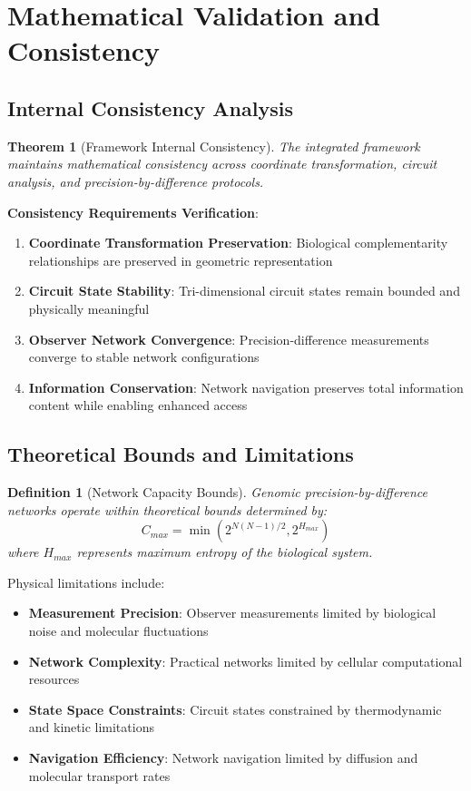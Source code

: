\documentclass[12pt,a4paper]{article}
\newtheorem{theorem}{Theorem}
\newtheorem{definition}{Definition}
\begin{document}
\section{Mathematical Validation and Consistency}

\subsection{Internal Consistency Analysis}

\begin{theorem}[Framework Internal Consistency]
The integrated framework maintains mathematical consistency across coordinate transformation, circuit analysis, and precision-by-difference protocols.
\end{theorem}

\textbf{Consistency Requirements Verification}:

\begin{enumerate}
\item \textbf{Coordinate Transformation Preservation}: Biological complementarity relationships are preserved in geometric representation
\item \textbf{Circuit State Stability}: Tri-dimensional circuit states remain bounded and physically meaningful
\item \textbf{Observer Network Convergence}: Precision-difference measurements converge to stable network configurations
\item \textbf{Information Conservation}: Network navigation preserves total information content while enabling enhanced access
\end{enumerate}

\subsection{Theoretical Bounds and Limitations}

\begin{definition}[Network Capacity Bounds]
Genomic precision-by-difference networks operate within theoretical bounds determined by:
\begin{equation}
C_{max} = \min(2^{N(N-1)/2}, 2^{H_{max}})
\end{equation}
where $H_{max}$ represents maximum entropy of the biological system.
\end{definition}

Physical limitations include:
\begin{itemize}
\item \textbf{Measurement Precision}: Observer measurements limited by biological noise and molecular fluctuations
\item \textbf{Network Complexity}: Practical networks limited by cellular computational resources
\item \textbf{State Space Constraints}: Circuit states constrained by thermodynamic and kinetic limitations
\item \textbf{Navigation Efficiency}: Network navigation limited by diffusion and molecular transport rates
\end{itemize}
\end{document}
